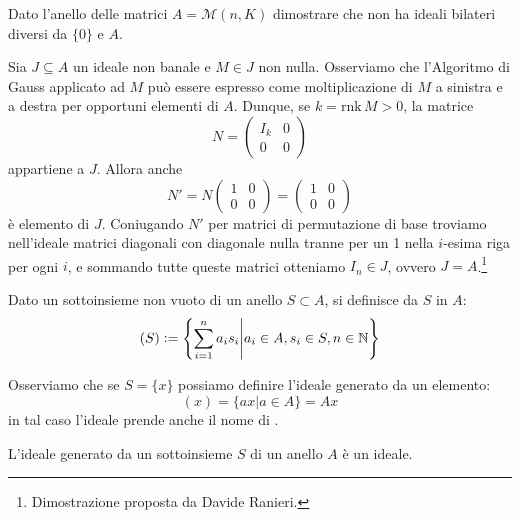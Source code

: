 \documentclass[11pt]{scrartcl}
\begin{document}
\begin{exercise}
    Dato l'anello delle matrici $A = \mathcal{M}(n,K)$ dimostrare che non ha ideali bilateri diversi da $\{0\}$ e $A$.
\end{exercise}

\begin{soln}
Sia $J\subseteq A$ un ideale non banale e $M\in J$ non nulla. Osserviamo che l'Algoritmo di Gauss applicato ad $M$ può essere espresso come moltiplicazione di $M$
a sinistra e a destra per opportuni elementi di $A$. Dunque, se $k=\mathrm{rnk}\, M>0$, la matrice 
\[ N=\left(\begin{array}{c|c}
    I_k & 0\\
    \hline
    0 & 0
\end{array}\right)
    \]
appartiene a $J$. Allora anche
\[
    N'=N\left(\begin{array}{c|c}
        1 & 0 \\
        \hline
        0 & 0
    \end{array}\right)
=\left(\begin{array}{c|c}
    1 & 0 \\
    \hline
    0 & 0
\end{array}\right)\]
è elemento di $J$. Coniugando $N'$ per matrici di permutazione di base troviamo nell'ideale matrici diagonali con diagonale nulla tranne per un 1
nella $i$-esima riga per ogni $i$, e sommando tutte queste matrici otteniamo $I_n\in J$, ovvero $J=A$.\footnote{Dimostrazione proposta da Davide Ranieri.}
\end{soln}

\begin{definition}
    Dato un sottoinsieme non vuoto di un anello $S \subset A$, si definisce  da $S$ in $A$:
        \[ (S) \vcentcolon =  \left\{\sum_{i = 1}^{n}a_is_i \middle| a_i \in A, s_i \in S, n \in \mathbb N\right\}
            \]
\end{definition}

Osserviamo che se $S = \{x\}$ possiamo definire l'ideale generato da un elemento:
        \[ (x) = \{ax | a \in A\} = Ax
            \]
in tal caso l'ideale prende anche il nome di .
        
\begin{proposition}
    L'ideale generato da un sottoinsieme $S$ di un anello $A$ è un ideale.
\end{proposition}
\end{document}
